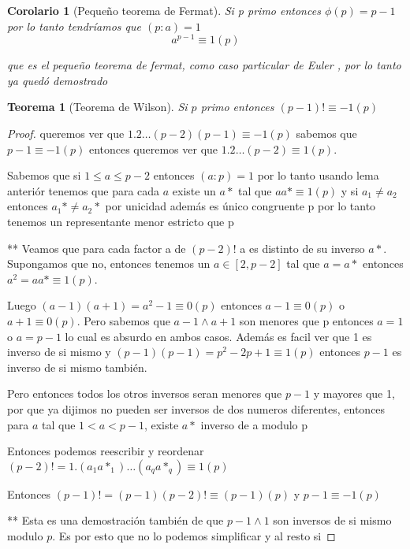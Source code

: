 \documentclass{article}
\theoremstyle{break}
\newtheorem{theorem}{Teorema}[section]
\newtheorem{corollary}{Corolario}[theorem]
\begin{document}
        \begin{corollary}[Pequeño teorema de Fermat]
            Si p primo entonces $\phi(p) = p-1$ por lo tanto tendríamos que $(p:a) = 1 $
            $$ a^{p-1} \equiv 1 (p)$$

            que es el pequeño teorema de fermat, como caso particular de Euler , por lo tanto ya quedó
            demostrado
        \end{corollary}

        \begin{theorem}[Teorema de Wilson]
            Si $p$ primo entonces $(p-1)! \equiv -1 (p)$
        \end{theorem}
        \begin{proof}
            queremos ver que $1.2\ldots (p-2)(p-1) \equiv -1 (p)$ sabemos que $p-1\equiv -1 (p)$
            entonces queremos ver que $1.2\ldots (p-2) \equiv 1 (p)$.

            Sabemos que si $1 \leq a \leq p-2$ entonces $(a:p)=1$ por lo tanto usando lema anteriór 
            tenemos que para cada $a$ existe un $a*$ tal que $aa*\equiv 1(p)$ y si $a_1\neq a_2$ 
            entonces $a_1*\neq a_2*$ por unicidad además es único congruente p por lo tanto
            tenemos un representante menor estricto que p

            ** Veamos que para cada factor a de $(p-2)!$ a es distinto de su inverso $a*$. Supongamos que no,
            entonces tenemos un $a\in [2,p-2]$ tal que $a=a*$ entonces $a^2 = aa* \equiv 1 (p)$. 
 
            Luego $(a-1)(a+1) = a^2 -1 \equiv 0 (p)$ entonces $a-1\equiv 0 (p)$ o $a+1\equiv 0 (p)$. Pero sabemos
            que $a-1 \land a+1$ son menores que p entonces $a=1$ o $a = p-1$ lo cual es absurdo en ambos casos.
            Además es facil ver que 1 es inverso de si mismo y $(p-1)(p-1)=p^2 -2p +1 \equiv 1 (p)$ entonces 
            $p-1$ es inverso de si mismo también.

            Pero entonces todos los otros inversos seran menores que $p-1$ y mayores que 1, por que ya dijimos
            no pueden ser inversos de dos numeros diferentes, entonces para $a$ tal que $1<a <p-1$, existe
            $a*$ inverso de a modulo p

            Entonces podemos reescribir y reordenar $(p-2)! = 1.(a_1a*_1)\ldots (a_qa*_q) \equiv 1 (p)$

            Entonces $(p-1)! = (p-1)(p-2)! \equiv (p-1) (p)$ y $p-1 \equiv -1 (p)$

            ** Esta es una demostración también de que $p-1 \land 1$ son inversos de si mismo modulo $p$. 
            Es por esto que no lo podemos simplificar y al resto si
        \end{proof}
\end{document}
